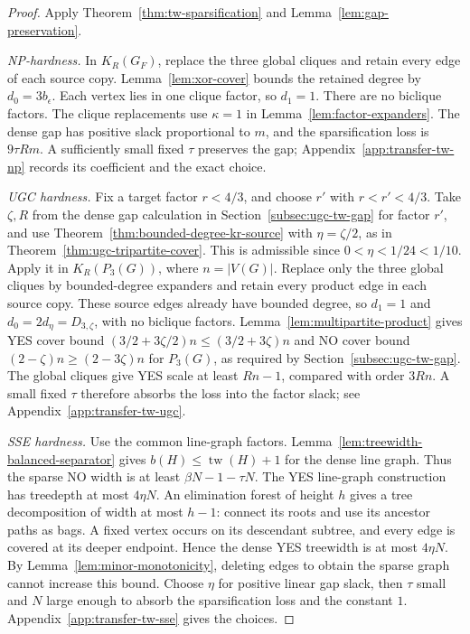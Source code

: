 \begin{proof}
Apply Theorem~\ref{thm:tw-sparsification} and
Lemma~\ref{lem:gap-preservation}.

\emph{NP-hardness.}
In $K_R(G_F)$, replace the three global cliques and retain every
edge of each source copy. Lemma~\ref{lem:xor-cover} bounds the
retained degree by $d_0=3b_\epsilon$. Each vertex lies in one
clique factor, so $d_1=1$. There are no biclique factors.
The clique replacements use $\kappa=1$ in
Lemma~\ref{lem:factor-expanders}.
The dense gap has positive slack proportional to $m$, and the
sparsification loss is $9\tau Rm$. A sufficiently small fixed $\tau$
preserves the gap; Appendix~\ref{app:transfer-tw-np} records its
coefficient and the exact choice.

\emph{UGC hardness.}
Fix a target factor $r<4/3$, and choose $r'$ with
$r<r'<4/3$. Take $\zeta,R$ from the dense gap calculation in
Section~\ref{subsec:ugc-tw-gap} for factor $r'$, and use
Theorem~\ref{thm:bounded-degree-kr-source} with $\eta=\zeta/2$,
as in Theorem~\ref{thm:ugc-tripartite-cover}. This is admissible
since $0<\eta<1/24<1/10$. Apply it in
$K_R(P_3(G))$, where $n=|V(G)|$.
Replace only the three global cliques by bounded-degree expanders
and retain every product edge in each source copy. These source
edges already have bounded degree, so
$d_1=1$ and $d_0=2d_\eta=D_{3,\zeta}$, with no biclique factors.
Lemma~\ref{lem:multipartite-product} gives YES cover bound
$(3/2+3\zeta/2)n\leq(3/2+3\zeta)n$ and NO cover bound
$(2-\zeta)n\geq(2-3\zeta)n$ for $P_3(G)$, as required by
Section~\ref{subsec:ugc-tw-gap}.
The global cliques give YES scale at least $Rn-1$, compared with
order $3Rn$. A small fixed $\tau$ therefore absorbs the loss into
the factor slack; see Appendix~\ref{app:transfer-tw-ugc}.

\emph{SSE hardness.}
Use the common line-graph factors.
Lemma~\ref{lem:treewidth-balanced-separator} gives
$b(H)\leq\operatorname{tw}(H)+1$ for the dense line graph.
Thus the sparse NO width is at least $\beta N-1-\tau N$.
The YES line-graph construction has treedepth at most $4\eta N$.
An elimination forest of height $h$ gives a tree decomposition of
width at most $h-1$: connect its roots and use its ancestor paths as
bags. A fixed vertex occurs on its descendant subtree, and every
edge is covered at its deeper endpoint. Hence the dense YES
treewidth is at most $4\eta N$. By
Lemma~\ref{lem:minor-monotonicity}, deleting edges to obtain the sparse
graph cannot increase this bound.
Choose $\eta$ for positive linear gap slack, then $\tau$ small and
$N$ large enough to absorb the sparsification loss and the constant
$1$. Appendix~\ref{app:transfer-tw-sse} gives the choices.

\end{proof}

